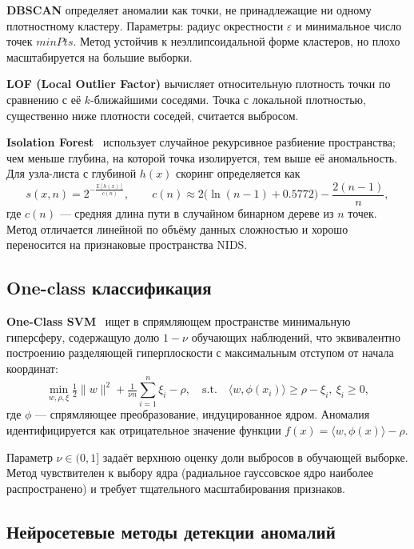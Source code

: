 \textbf{DBSCAN} определяет аномалии как точки, не принадлежащие ни одному
плотностному кластеру. Параметры: радиус окрестности \(\varepsilon\) и
минимальное число точек \(\mathit{minPts}\). Метод устойчив к
неэллипсоидальной форме кластеров, но плохо масштабируется на большие выборки.

\textbf{LOF (Local Outlier Factor)} вычисляет относительную плотность точки
по сравнению с её \(k\)-ближайшими соседями. Точка с локальной плотностью,
существенно ниже плотности соседей, считается выбросом.

\textbf{Isolation Forest}~\cite{liu2008isolation} использует случайное
рекурсивное разбиение пространства; чем меньше глубина, на которой точка
изолируется, тем выше её аномальность. Для узла-листа с глубиной \(h(x)\)
скоринг определяется как
\begin{equation}
s(x, n) = 2^{-\frac{\mathbb{E}[h(x)]}{c(n)}},
\qquad
c(n) \approx 2\bigl(\ln(n-1) + 0.5772\bigr) - \frac{2(n-1)}{n},
\label{eq:iforest}
\end{equation}
где \(c(n)\) --- средняя длина пути в случайном бинарном дереве из \(n\)
точек. Метод отличается линейной по объёму данных сложностью и хорошо
переносится на признаковые пространства NIDS.

\subsection{One-class классификация}

\textbf{One-Class SVM}~\cite{scholkopf2001ocsvm} ищет в спрямляющем
пространстве минимальную гиперсферу, содержащую долю \(1-\nu\) обучающих
наблюдений, что эквивалентно построению разделяющей гиперплоскости с
максимальным отступом от начала координат:
\begin{equation}
\min_{w, \rho, \xi} \tfrac{1}{2}\|w\|^{2} + \tfrac{1}{\nu n}\sum_{i=1}^{n}\xi_i - \rho,
\quad \text{s.t.}\quad \langle w, \phi(x_i)\rangle \geq \rho - \xi_i,\ \xi_i \geq 0,
\label{eq:ocsvm}
\end{equation}
где \(\phi\) --- спрямляющее преобразование, индуцированное ядром.
Аномалия идентифицируется как отрицательное значение функции
\(f(x) = \langle w, \phi(x)\rangle - \rho\).

Параметр \(\nu \in (0, 1]\) задаёт верхнюю оценку доли выбросов в обучающей
выборке. Метод чувствителен к выбору ядра (радиальное гауссовское ядро
наиболее распространено) и требует тщательного масштабирования признаков.

\subsection{Нейросетевые методы детекции аномалий}

